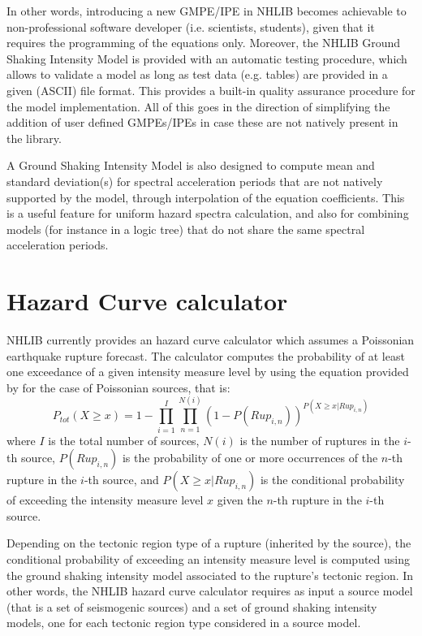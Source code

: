 \documentclass[11pt,a4paper,headings=small,dvips]{scrartcl}
\begin{document}
In other words, introducing a new GMPE/IPE in NHLIB becomes achievable 
to non-professional software developer (i.e. scientists, students), given 
that it requires the programming of the equations only. Moreover, the 
NHLIB Ground Shaking Intensity Model is provided with an automatic testing 
procedure, which allows to validate a model as long as test data (e.g. 
tables) are provided in a given (ASCII) file format. This provides a 
built-in quality assurance procedure for the model implementation. 
All of this goes in the direction of simplifying the addition of user 
defined GMPEs/IPEs in case these are not natively present in the library.

A Ground Shaking Intensity Model is also designed to compute mean and 
standard deviation(s) for spectral acceleration periods that are not 
natively supported by the model, through interpolation of the equation 
coefficients. This is a useful feature for uniform hazard spectra 
calculation, and also for combining models (for instance in a logic 
tree) that do not share the same spectral acceleration periods.
 
\section{Hazard Curve calculator}\label{hcc}
\setcounter{figure}{0}
NHLIB currently provides an hazard curve calculator which assumes a 
Poissonian earthquake rupture forecast. The calculator computes the 
probability of at least one exceedance of a given intensity measure 
level by using the equation provided by \cite{field2003} for the case 
of Poissonian sources, that is:
\begin{equation}
P_{tot}(X\geq x) = 1 - \prod_{i=1}^{I} \prod_{n=1}^{N(i)} (1 - P(Rup_{i,n}))^{P(X \geq x | Rup_{i,n})}
\end{equation}
where $I$ is the total number of sources, $N(i)$ is the number of 
ruptures in the $i$-th source, $P(Rup_{i,n})$ is the probability of 
one or more occurrences of the $n$-th rupture in the $i$-th source, 
and  $P(X \geq x | Rup_{i,n})$ is the conditional probability of 
exceeding the intensity measure level $x$ given the $n$-th rupture 
in the $i$-th source.

Depending on the tectonic region type of a rupture (inherited by 
the source), the conditional probability of exceeding an intensity 
measure level is computed using the ground shaking intensity model 
associated to the rupture's tectonic region. In other words, the NHLIB 
hazard curve calculator requires as input a source model (that is a 
set of seismogenic sources) and a set of ground shaking intensity 
models, one for each tectonic region type considered in a source model.
\end{document}
